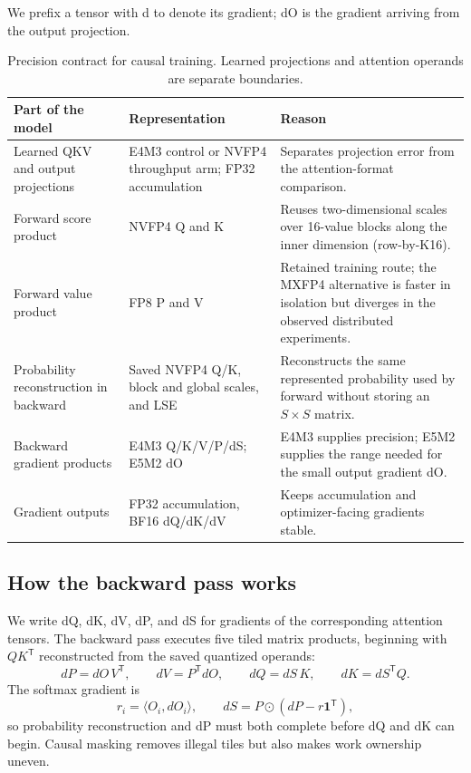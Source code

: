 We prefix a tensor with d to denote its gradient; dO is the gradient arriving
from the output projection.

\begin{table}[htbp]
\centering
\caption{Precision contract for causal training.  Learned projections and
attention operands are separate boundaries.}
\label{tab:causal-precision-contract}
\small
\begin{tabularx}{\textwidth}{p{}p{}X}
\toprule
Part of the model & Representation & Reason \\
\midrule
Learned QKV and output projections & E4M3 control or NVFP4 throughput arm;
FP32 accumulation & Separates projection error from the attention-format
comparison. \\
Forward score product & NVFP4 Q and K & Reuses two-dimensional scales over
16-value blocks along the inner dimension (row-by-K16). \\
Forward value product & FP8 P and V & Retained training route; the MXFP4
alternative is faster in isolation but diverges in the observed distributed
experiments. \\
Probability reconstruction in backward & Saved NVFP4 Q/K, block and global
scales, and LSE &
Reconstructs the same represented probability used by forward without storing
an $S\times S$ matrix. \\
Backward gradient products & E4M3 Q/K/V/P/dS; E5M2 dO & E4M3 supplies
precision; E5M2 supplies the range needed for the small output gradient dO. \\
Gradient outputs & FP32 accumulation, BF16 dQ/dK/dV & Keeps accumulation and
optimizer-facing gradients stable. \\
\bottomrule
\end{tabularx}
\end{table}
\FloatBarrier

\subsection{How the backward pass works}

We write dQ, dK, dV, dP, and dS for gradients of the corresponding attention
tensors.  The backward pass executes five tiled matrix products, beginning
with $QK^\mathsf{T}$ reconstructed from the saved quantized operands:
\begin{equation}
  dP=dO\,V^\mathsf{T},\qquad
  dV=P^\mathsf{T}dO,\qquad
  dQ=dS\,K,\qquad
  dK=dS^\mathsf{T}Q.
  \label{eq:causal-bwd-products}
\end{equation}
The softmax gradient is
\begin{equation}
  r_i=\langle O_i,dO_i\rangle,\qquad
  dS=P\odot(dP-r\mathbf 1^\mathsf{T}),
  \label{eq:causal-bwd-ds}
\end{equation}
so probability reconstruction and dP must both complete before dQ and dK can
begin.  Causal masking removes illegal tiles but also makes work ownership
uneven.

